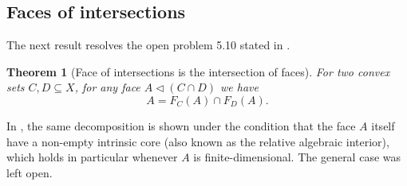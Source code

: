 \documentclass{article}
\theoremstyle{plain}
\newtheorem{theorem}{Theorem}[section]
\theoremstyle{definition}
\theoremstyle{remark}
\begin{document}
\subsection{Faces of intersections}
\label{loc:body.applications.faces_of_intersections}
The next result resolves the open problem 5.10 stated in
\cite{weisNoteFacesConvex2025}.
\begin{theorem}[Face of intersections is the intersection of faces]
\label{loc:face_of_intersections_is_the_intersection_of_faces.statement}
For two convex sets $C, D \subseteq X$, for any face $A \triangleleft (C \cap D)$
we have 
\begin{equation*}
A = F_C(A) \cap F_D(A).
\end{equation*}
\end{theorem}
In \cite{weisNoteFacesConvex2025}, the same decomposition is shown under the
condition that the face $A$ itself have a non-empty intrinsic core (also known
as the relative algebraic interior), which
holds in particular whenever $A$ is finite-dimensional. The general case was
left open.
\end{document}
